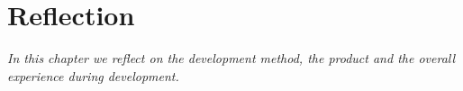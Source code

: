 \chapter{Reflection}
\label{cha:reflection}

\textit{In this chapter we reflect on the development method, the product and the overall experience during development.}
\newpage








